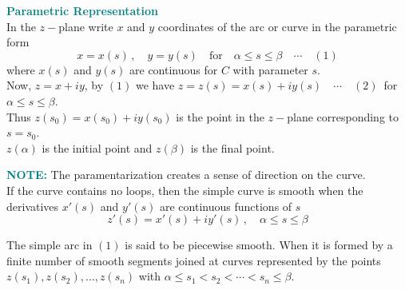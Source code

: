 \documentclass[11pt,a4paper]{article}
\theoremstyle{definition}
\begin{document}
\textbf{\textcolor{teal}{Parametric Representation}}\\
In the $z-$plane write $x$ and $y$ coordinates of the arc or curve in the parametric form $$x = x(s)\,, \quad  y = y(s)\quad \text{for}\quad  \alpha \leq s\leq \beta\quad \cdots\quad  (1)$$
where $x(s)$ and $y(s)$ are continuous for $C$ with parameter $s$.\\

Now, $z = x + iy$, by $(1)$ we have $z = z(s) = x(s) + iy(s)\quad \cdots\quad  (2)\,$ for $\alpha \leq s \leq \beta$.\\

Thus $ z(s_0) = x(s_0) + iy(s_0)$ is the point in the $z-$plane corresponding to $s = s_0$.\\

$z(\alpha)$ is the initial point and  $z(\beta)$ is the final point.



\begin{figure}[H]
\centering
{}
\end{figure}














\textbf{\textcolor{teal}{NOTE:}} The paramentarization creates a sense of direction on the curve.\\

If the curve contains no loops, then the simple curve is smooth when the derivatives $x'(s)$ and $y'(s)$ are continuous functions of $s$
$$z'(s) = x'(s) + iy'(s)\,, \quad  \alpha \leq s \leq \beta$$

The simple arc in $(1)$ is said to be piecewise smooth. When it is formed by a finite number of smooth segments joined at curves represented by the points $z(s_1), z(s_2), \ldots, z(s_n)$ with $\alpha \leq s_1< s_2< \cdots <s_n\leq \beta$.\\
\end{document}
